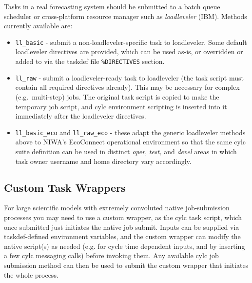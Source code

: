 \documentclass[11pt,a4paper]{article}
\begin{document}
Tasks in a real forecasting system should be submitted to a batch queue
scheduler or cross-platform resource manager such as {\em loadleveler}
(IBM). Methods currently available are:

\lstset{language=cylctaskdef}

\begin{itemize} 
    
    \item \lstinline=ll_basic= - submit a non-loadleveler-specific task
        to loadleveler. Some default loadleveler directives are
        provided, which can be used as-is, or overridden or added to
        via the taskdef file \lstinline=%DIRECTIVES= section.

    \item \lstinline=ll_raw= - submit a loadleveler-ready task to loadleveler (the task 
        script must contain all required directives already). This may be necessary for
        complex (e.g.\ multi-step) jobs. The original task script is copied to
        make the temporary job script, and cylc environment
        scripting is inserted into it immediately after the loadleveler directives.

    \item \lstinline=ll_basic_eco= and \lstinline=ll_raw_eco= - these
        adapt the generic loadleveler methods above to NIWA's EcoConnect
        operational environment so that the same cylc suite definition
        can be used in distinct {\em oper}, {\em test,} and {\em devel}
        areas in which task owner username and home directory vary
        accordingly.

\end{itemize}

\subsection{Custom Task Wrappers}

For large scientific models with extremely convoluted native
job-submission processes you may need to use a custom wrapper, 
as the cylc task script, which once submitted just initiates the 
native job submit. Inputs can be supplied via taskdef-defined
environment variables, and the custom wrapper can modify the native
script(s) as needed (e.g. for cycle time dependent inputs, and by
inserting a few cylc messaging calls) before invoking them.
Any available cylc job submission method can then be used to submit the
custom wrapper that initiates the whole process.
\end{document}
